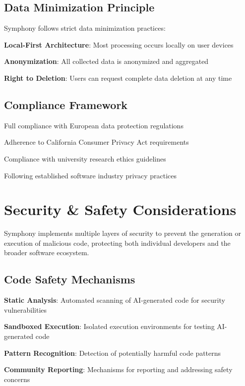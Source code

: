 \subsection*{Data Minimization Principle}
Symphony follows strict data minimization practices:

\begin{compactlist}
    \item \textbf{Local-First Architecture}: Most processing occurs locally on user devices
    \item \textbf{Anonymization}: All collected data is anonymized and aggregated
    \item \textbf{Right to Deletion}: Users can request complete data deletion at any time
\end{compactlist}

\subsection*{Compliance Framework}
\begin{description}[leftmargin=3cm,labelwidth=2.5cm]
    \item[\textbf{GDPR}] Full compliance with European data protection regulations
    \item[\textbf{CCPA}] Adherence to California Consumer Privacy Act requirements
    \item[\textbf{Academic Ethics}] Compliance with university research ethics guidelines
    \item[\textbf{Industry Standards}] Following established software industry privacy practices
\end{description}

\section*{Security \& Safety Considerations}

\begin{alertbox}
Symphony implements multiple layers of security to prevent the generation or execution of malicious code, protecting both individual developers and the broader software ecosystem.
\end{alertbox}

\subsection*{Code Safety Mechanisms}
\begin{compactlist}
    \item \textbf{Static Analysis}: Automated scanning of AI-generated code for security vulnerabilities
    \item \textbf{Sandboxed Execution}: Isolated execution environments for testing AI-generated code
    \item \textbf{Pattern Recognition}: Detection of potentially harmful code patterns
    \item \textbf{Community Reporting}: Mechanisms for reporting and addressing safety concerns
\end{compactlist}

